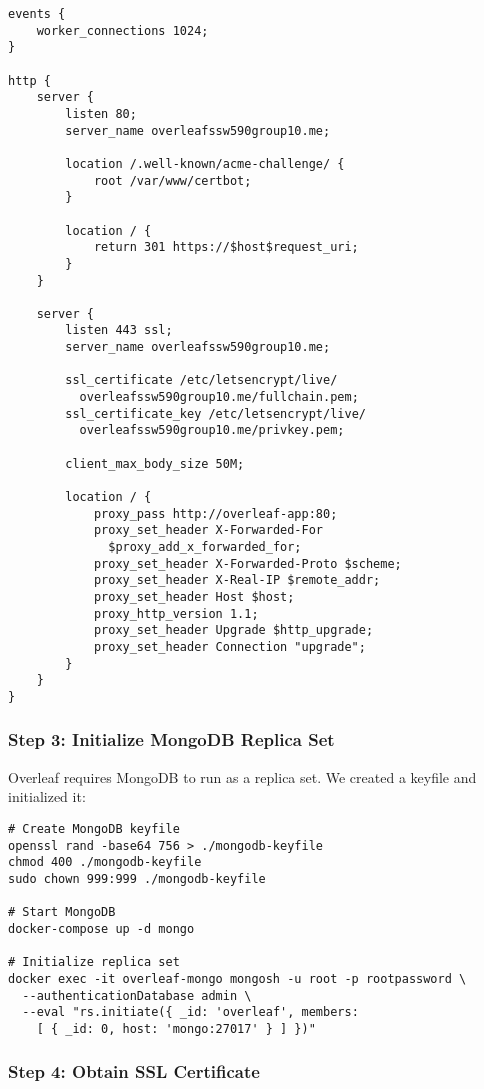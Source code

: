 \begin{verbatim}
events {
    worker_connections 1024;
}

http {
    server {
        listen 80;
        server_name overleafssw590group10.me;

        location /.well-known/acme-challenge/ {
            root /var/www/certbot;
        }

        location / {
            return 301 https://$host$request_uri;
        }
    }

    server {
        listen 443 ssl;
        server_name overleafssw590group10.me;

        ssl_certificate /etc/letsencrypt/live/
          overleafssw590group10.me/fullchain.pem;
        ssl_certificate_key /etc/letsencrypt/live/
          overleafssw590group10.me/privkey.pem;

        client_max_body_size 50M;

        location / {
            proxy_pass http://overleaf-app:80;
            proxy_set_header X-Forwarded-For 
              $proxy_add_x_forwarded_for;
            proxy_set_header X-Forwarded-Proto $scheme;
            proxy_set_header X-Real-IP $remote_addr;
            proxy_set_header Host $host;
            proxy_http_version 1.1;
            proxy_set_header Upgrade $http_upgrade;
            proxy_set_header Connection "upgrade";
        }
    }
}
\end{verbatim}

\subsubsection{Step 3: Initialize MongoDB Replica Set}

Overleaf requires MongoDB to run as a replica set. We created a keyfile and initialized it:

\begin{verbatim}
# Create MongoDB keyfile
openssl rand -base64 756 > ./mongodb-keyfile
chmod 400 ./mongodb-keyfile
sudo chown 999:999 ./mongodb-keyfile

# Start MongoDB
docker-compose up -d mongo

# Initialize replica set
docker exec -it overleaf-mongo mongosh -u root -p rootpassword \
  --authenticationDatabase admin \
  --eval "rs.initiate({ _id: 'overleaf', members: 
    [ { _id: 0, host: 'mongo:27017' } ] })"
\end{verbatim}

\subsubsection{Step 4: Obtain SSL Certificate}

